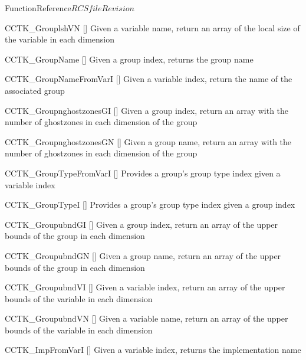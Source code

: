 \begin{cactuspart}{FunctionReference}{$RCSfile$}{$Revision$}
\begin{Lentry}
\item[CCTK\_GrouplshVN] [\pageref{CCTK-GrouplshVN}]
  Given a variable name, return an array of the local size of the variable in each dimension

\item[CCTK\_GroupName]
  [\pageref{CCTK-GroupName}]
  Given a group index, returns the group name

\item[CCTK\_GroupNameFromVarI]
  [\pageref{CCTK-GroupNameFromVarI}]
  Given a variable index, return the name of the associated group

\item[CCTK\_GroupnghostzonesGI] [\pageref{CCTK-GroupnghostzonesGI}]
  Given a group index, return an array with the number of ghostzones in each dimension of the group

\item[CCTK\_GroupnghostzonesGN] [\pageref{CCTK-GroupnghostzonesGN}]
  Given a group name, return an array with the number of ghostzones in each dimension of the group

\item[CCTK\_GroupTypeFromVarI]
  [\pageref{CCTK-GroupTypeFromVarI}]
  Provides a group's group type index given a variable index

\item[CCTK\_GroupTypeI]
  [\pageref{CCTK-GroupTypeI}]
  Provides a group's group type index given a group index

\item[CCTK\_GroupubndGI] [\pageref{CCTK-GroupubndGI}]
  Given a group index, return an array of the upper bounds of the group in each dimension

\item[CCTK\_GroupubndGN] [\pageref{CCTK-GroupubndGN}]
  Given a group name, return an array of the upper bounds of the group in each dimension

\item[CCTK\_GroupubndVI] [\pageref{CCTK-GroupubndVI}]
  Given a variable index, return an array of the upper bounds of the variable in each dimension

\item[CCTK\_GroupubndVN] [\pageref{CCTK-GroupubndVN}]
  Given a variable name, return an array of the upper bounds of the variable in each dimension

\item[CCTK\_ImpFromVarI]
  [\pageref{CCTK-ImpFromVarI}]
  Given a variable index, returns the implementation name


\end{Lentry}
\end{cactuspart}
